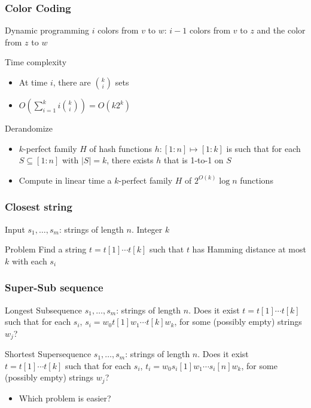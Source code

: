\documentclass[12pt,aspectratio=169]{beamer}
\begin{document}
\begin{frame}\frametitle{Color Coding }
  \begin{block}{Dynamic programming}
    $i$ colors from $v$ to $w$:
    $i-1$ colors from $v$ to $z$ and the color from $z$ to $w$
  \end{block}

  \begin{block}{Time complexity}
    \begin{itemize}
      \item
    At time $i$, there are $k \choose i$ sets
  \item
    $O(\sum_{i=1}^{k} i {k \choose i}) = O(k 2^{k})$
  \end{itemize}
\end{block}
  \begin{block}{Derandomize}
    \begin{itemize}
    \item
      $k$-perfect family $H$ of hash functions $h:[1:n]\mapsto [1:k]$ is such that for
      each $S\subseteq [1:n]$ with $|S|=k$, there exists $h$ that is 1-to-1 on $S$
    \item
      Compute in linear time a $k$-perfect family $H$ of $2^{O(k)}\log n$ functions
    \end{itemize}
  \end{block}
\end{frame}

\begin{frame}\frametitle{Closest string }
    \begin{block}{Input}
      $s_{1}, \ldots, s_{m}$: strings of length $n$.
      Integer $k$
    \end{block}

    \begin{block}{Problem}
      Find a string $t=t[1]\cdots t[k]$ such that $t$ has Hamming distance at most $k$
      with each $s_{i}$
    \end{block}
  \end{frame}

  \begin{frame}\frametitle{Super-Sub sequence }
    \begin{block}{Longest Subsequence}
      $s_{1}, \ldots, s_{m}$: strings of length $n$.
%
      Does it exist $t=t[1]\cdots t[k]$ such that for  each $s_{i}$, $s_{i} = w_{0} t[1] w_{1} \cdots
      t[k]w_{k}$, for some (possibly empty) strings $w_{j}$?
    \end{block}
    \begin{block}{Shortest Supersequence}
      $s_{1}, \ldots, s_{m}$: strings of length $n$.
%
      Does it exist $t=t[1]\cdots t[k]$ such that for  each $s_{i}$, $t_{i} = w_{0} s_{i}[1] w_{1} \cdots
      s_{i}[n]w_{k}$, for some (possibly empty) strings $w_{j}$?
    \end{block}

    \begin{itemize}
    \item
      Which problem is easier?
    \end{itemize}
  \end{frame} 
\end{document}
